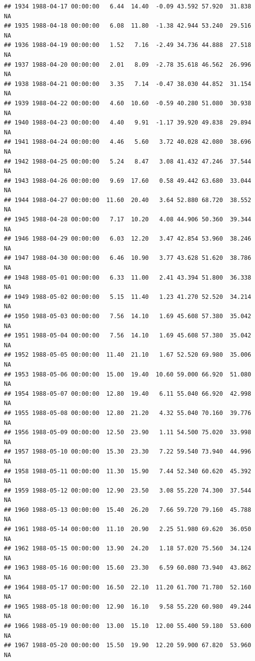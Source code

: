 \documentclass{article}\usepackage{graphicx, color}
\makeatletter
\newenvironment{kframe}{%
 \def\at@end@of@kframe{}%
 \ifinner\ifhmode%
  \def\at@end@of@kframe{\end{minipage}}%
  \begin{minipage}{\columnwidth}%
 \fi\fi%
 \def\FrameCommand##1{\hskip\@totalleftmargin \hskip-\fboxsep
 \colorbox{shadecolor}{##1}\hskip-\fboxsep
     \hskip-\linewidth \hskip-\@totalleftmargin \hskip\columnwidth}%
 \MakeFramed {\advance\hsize-\width
   \@totalleftmargin\z@ \linewidth\hsize
   \@setminipage}}%
 {\par\unskip\endMakeFramed%
 \at@end@of@kframe}
\newenvironment{knitrout}{}{} %
\makeatother
\begin{document}
\begin{knitrout}
\begin{kframe}
\begin{verbatim}
## 1934 1988-04-17 00:00:00   6.44  14.40  -0.09 43.592 57.920  31.838     NA
## 1935 1988-04-18 00:00:00   6.08  11.80  -1.38 42.944 53.240  29.516     NA
## 1936 1988-04-19 00:00:00   1.52   7.16  -2.49 34.736 44.888  27.518     NA
## 1937 1988-04-20 00:00:00   2.01   8.09  -2.78 35.618 46.562  26.996     NA
## 1938 1988-04-21 00:00:00   3.35   7.14  -0.47 38.030 44.852  31.154     NA
## 1939 1988-04-22 00:00:00   4.60  10.60  -0.59 40.280 51.080  30.938     NA
## 1940 1988-04-23 00:00:00   4.40   9.91  -1.17 39.920 49.838  29.894     NA
## 1941 1988-04-24 00:00:00   4.46   5.60   3.72 40.028 42.080  38.696     NA
## 1942 1988-04-25 00:00:00   5.24   8.47   3.08 41.432 47.246  37.544     NA
## 1943 1988-04-26 00:00:00   9.69  17.60   0.58 49.442 63.680  33.044     NA
## 1944 1988-04-27 00:00:00  11.60  20.40   3.64 52.880 68.720  38.552     NA
## 1945 1988-04-28 00:00:00   7.17  10.20   4.08 44.906 50.360  39.344     NA
## 1946 1988-04-29 00:00:00   6.03  12.20   3.47 42.854 53.960  38.246     NA
## 1947 1988-04-30 00:00:00   6.46  10.90   3.77 43.628 51.620  38.786     NA
## 1948 1988-05-01 00:00:00   6.33  11.00   2.41 43.394 51.800  36.338     NA
## 1949 1988-05-02 00:00:00   5.15  11.40   1.23 41.270 52.520  34.214     NA
## 1950 1988-05-03 00:00:00   7.56  14.10   1.69 45.608 57.380  35.042     NA
## 1951 1988-05-04 00:00:00   7.56  14.10   1.69 45.608 57.380  35.042     NA
## 1952 1988-05-05 00:00:00  11.40  21.10   1.67 52.520 69.980  35.006     NA
## 1953 1988-05-06 00:00:00  15.00  19.40  10.60 59.000 66.920  51.080     NA
## 1954 1988-05-07 00:00:00  12.80  19.40   6.11 55.040 66.920  42.998     NA
## 1955 1988-05-08 00:00:00  12.80  21.20   4.32 55.040 70.160  39.776     NA
## 1956 1988-05-09 00:00:00  12.50  23.90   1.11 54.500 75.020  33.998     NA
## 1957 1988-05-10 00:00:00  15.30  23.30   7.22 59.540 73.940  44.996     NA
## 1958 1988-05-11 00:00:00  11.30  15.90   7.44 52.340 60.620  45.392     NA
## 1959 1988-05-12 00:00:00  12.90  23.50   3.08 55.220 74.300  37.544     NA
## 1960 1988-05-13 00:00:00  15.40  26.20   7.66 59.720 79.160  45.788     NA
## 1961 1988-05-14 00:00:00  11.10  20.90   2.25 51.980 69.620  36.050     NA
## 1962 1988-05-15 00:00:00  13.90  24.20   1.18 57.020 75.560  34.124     NA
## 1963 1988-05-16 00:00:00  15.60  23.30   6.59 60.080 73.940  43.862     NA
## 1964 1988-05-17 00:00:00  16.50  22.10  11.20 61.700 71.780  52.160     NA
## 1965 1988-05-18 00:00:00  12.90  16.10   9.58 55.220 60.980  49.244     NA
## 1966 1988-05-19 00:00:00  13.00  15.10  12.00 55.400 59.180  53.600     NA
## 1967 1988-05-20 00:00:00  15.50  19.90  12.20 59.900 67.820  53.960     NA

\end{verbatim}
\end{kframe}
\end{knitrout}
\end{document}
